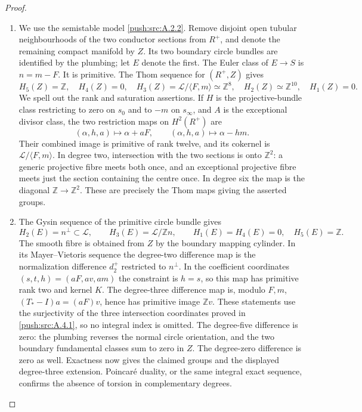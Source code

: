\begin{proof}
\begin{enumerate}[label=\arabic*.,leftmargin=*]
\item We use the semistable model \ref{push:src:A.2.2}. Remove disjoint
open tubular neighbourhoods of the two conductor sections
from $R^+$, and denote the remaining compact manifold by
$Z$. Its two boundary circle bundles are identified by the
plumbing; let $E$ denote the first. The Euler class of
$E\to S$ is $n=m-F$. It is primitive. The Thom sequence
for $(R^+,Z)$ gives
\[
 H_5(Z)=\mathbb Z,\quad H_4(Z)=0,\quad
 H_3(Z)=\mathcal L/\langle F,m\rangle\simeq\mathbb Z^8,
 \quad H_2(Z)\simeq\mathbb Z^{10},\quad H_1(Z)=0.
\]
We spell out the rank and saturation assertions. If $H$ is
the projective-bundle class restricting to zero on $s_0$
and to $-m$ on $s_\infty$, and $A$ is the exceptional
divisor class, the two restriction maps on $H^2(R^+)$ are
\[
 (\alpha,h,a)\longmapsto\alpha+aF,\qquad
 (\alpha,h,a)\longmapsto\alpha-hm.
\]
Their combined image is primitive of rank twelve, and its
cokernel is $\mathcal L/\langle F,m\rangle$. In degree two,
intersection with the two sections is onto $\mathbb Z^2$:
a generic projective fibre meets both once, and an exceptional
projective fibre meets just the section containing the centre
once. In degree six the map is the diagonal
$\mathbb Z\to\mathbb Z^2$. These are precisely the Thom
maps giving the asserted groups.

\item The Gysin sequence of the primitive circle bundle gives
\[
 H_2(E)=n^\perp\subset\mathcal L,\qquad
 H_3(E)=\mathcal L/\mathbb Z n,\qquad
 H_1(E)=H_4(E)=0,\quad H_5(E)=\mathbb Z.
\]
The smooth fibre is obtained from $Z$ by the boundary
mapping cylinder. In its Mayer--Vietoris sequence the
degree-two difference map is the normalization difference
$d_2^+$ restricted to $n^\perp$. In the coefficient
coordinates $(s,t,h)=(aF,av,am)$ the constraint is $h=s$,
so this map has primitive rank two and kernel $K$.
The degree-three difference map is, modulo $F,m$,
$(T_*-I)a=(aF)v$, hence has primitive image $\mathbb Z v$.
These statements use the surjectivity of the three
intersection coordinates proved in \ref{push:src:A.4.1}, so no integral
index is omitted. The degree-five difference is zero:
the plumbing reverses the normal circle orientation, and
the two boundary fundamental classes sum to zero in $Z$.
The degree-zero difference is zero as well. Exactness now
gives the claimed groups and the displayed degree-three
extension. Poincar\'e duality, or the same integral exact
sequence, confirms the absence of torsion in complementary
degrees.


\end{enumerate}
\end{proof}
